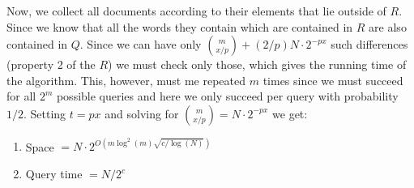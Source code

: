 \documentclass{article}
\begin{document}
Now, we collect all documents according to their elements that lie outside of $R$. 
Since we know that all the words they contain which are contained in $R$ are also contained in $Q$.
Since we can have only ${m \choose x/p} + (2/p)N\cdot 2^{-px}$ such differences (property 2 of the $R$) 
we must check only those, which gives the running time of the algorithm. This, however, must me repeated $m$ times since
we must succeed for all $2^m$ possible queries and here we only succeed per query with probability $1/2$.
Setting $t = px$ and solving for  ${m \choose x/p} = N\cdot 2^{-px}$ we get:
\begin{enumerate}
\item Space $= N\cdot 2^{O\left(m\log^{2}(m)\sqrt{c/\log(N)}\right)}$
\item Query time $= N/2^c$ 
\end{enumerate} 
 
 


\end{document}
